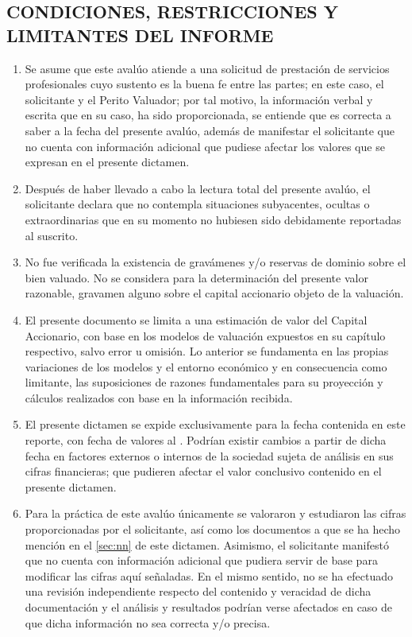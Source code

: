 \subsection{CONDICIONES, RESTRICCIONES Y LIMITANTES DEL INFORME}

\begin{enumerate}[\indent a)]

\item Se asume que este avalúo atiende a una solicitud de prestación de servicios profesionales cuyo sustento es la buena fe entre las partes; en este caso, el solicitante y el Perito Valuador; por tal motivo, la información verbal y escrita que en su caso, ha sido proporcionada, se entiende que es correcta a saber a la fecha del presente avalúo, además de manifestar el solicitante que no cuenta con información adicional  que pudiese afectar los valores que se expresan en el presente dictamen.

\item Después de haber llevado a cabo la lectura total del presente avalúo, el solicitante declara que no contempla situaciones subyacentes, ocultas o extraordinarias que en su momento no hubiesen sido debidamente reportadas al suscrito.

\item No fue verificada la existencia de gravámenes y/o reservas de dominio sobre el bien valuado. No se considera para la determinación del presente valor razonable, gravamen alguno sobre el capital accionario objeto de la valuación.

\item El presente documento se limita a una estimación de valor del Capital Accionario, con base en los modelos de valuación expuestos en su capítulo respectivo, salvo error u omisión. Lo anterior se fundamenta en las propias variaciones de los modelos y el entorno económico y en consecuencia como limitante, las suposiciones de razones fundamentales para su proyección y cálculos realizados con base en la información recibida.

\item El presente dictamen se expide exclusivamente para la fecha contenida en este reporte, con fecha de valores  al \textcolor{principal}{\textbf{\fechaValores}}. Podrían existir cambios a partir de dicha fecha en factores externos o internos de la sociedad sujeta de análisis en sus cifras financieras; que pudieren afectar el valor conclusivo contenido en el presente dictamen.

\item Para la práctica de este avalúo únicamente se valoraron y estudiaron las cifras proporcionadas por el solicitante, así como los documentos a que se ha hecho mención en el \autoref{sec:nn} de este dictamen. Asimismo, el solicitante manifestó que no cuenta con información adicional que pudiera servir de base para modificar las cifras aquí señaladas. En el mismo sentido, no se ha efectuado una revisión independiente respecto del contenido y veracidad de dicha documentación y el análisis y resultados podrían verse afectados en caso de que dicha información no sea correcta y/o precisa.


\end{enumerate}
